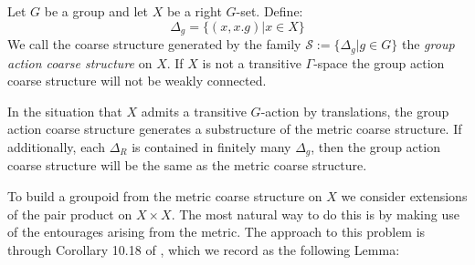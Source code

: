 \begin{conjecture}
{\begin{example}\label{ex:GACS}
Let $G$ be a group and let $X$ be a right $G$-set. Define:
\begin{equation*}
\Delta_{g}=\lbrace (x,x.g) | x \in X \rbrace  
\end{equation*}
We call the coarse structure generated by the family $\mathcal{S}:=\lbrace \Delta_{g} | g\in G\rbrace$ the \textit{group action coarse structure} on $X$. If $X$ is not a transitive $\Gamma$-space the group action coarse structure will not be weakly connected.
\end{example}

In the situation that $X$ admits a transitive $G$-action by translations, the group action coarse structure generates a substructure of the metric coarse structure. If additionally, each $\Delta_{R}$ is contained in finitely many $\Delta_{g}$, then the group action coarse structure will be the same as the metric coarse structure.

To build a groupoid from the metric coarse structure on $X$ we consider extensions of the pair product on $X \times X$. The most natural way to do this is by making use of the entourages arising from the metric. The approach to this problem is through Corollary 10.18 of \cite{MR2007488}, which we record as the following Lemma:

}
\end{conjecture}
